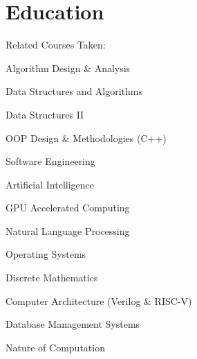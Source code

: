\documentclass[]{m abbas resume' 2022}
\begin{document}
\begin{minipage}[t]{0.53\textwidth} 
    


\section{Education} 
 
    Related Courses Taken:
    \vspace{0.23cm}
    \begin{tightemize}
        \item Algorithm Design \& Analysis
        \item Data Structures and Algorithms
        \item Data Structures II
        \item OOP Design \& Methodologies (C++)
        \item Software Engineering
        \item Artificial Intelligence
        \item GPU Accelerated Computing
        \item Natural Language Processing
        \item Operating Systems
        \item Discrete Mathematics
        \item Computer Architecture (Verilog \& RISC-V)
        \item Database Management Systems
        \item Nature of Computation
    \end{tightemize}
    
    \sectionsep

\end{minipage}
\end{document}
